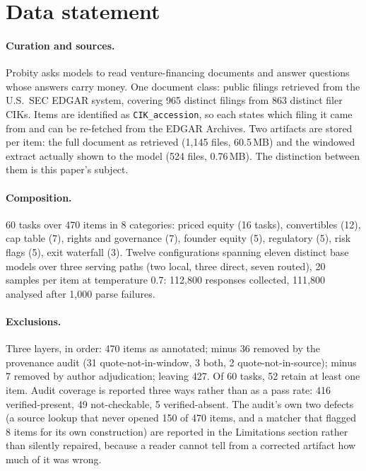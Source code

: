 \section{Data statement}
\label{sec:datastatement}

\paragraph{Curation and sources.} Probity asks models to read venture-financing documents and answer
questions whose answers carry money. One document class: public filings retrieved from the U.S.\ SEC
EDGAR system, covering 965 distinct filings from 863 distinct filer CIKs. Items are identified as
\texttt{CIK\_accession}, so each states which filing it came from and can be re-fetched from the
EDGAR Archives. Two artifacts are stored per item: the full document as retrieved
(1{,}145 files, 60.5\,MB) and the windowed extract actually shown to the model
(524 files, 0.76\,MB). The distinction between them is this paper's subject.

\paragraph{Composition.} 60 tasks over 470 items in 8 categories: priced equity (16 tasks),
convertibles (12), cap table (7), rights and governance (7), founder equity (5), regulatory (5),
risk flags (5), exit waterfall (3). Twelve configurations spanning eleven distinct base models over
three serving paths (two local, three direct, seven routed), 20 samples per item at temperature 0.7:
112{,}800 responses collected, 111{,}800 analysed after 1{,}000 parse failures.

\paragraph{Exclusions.} Three layers, in order: 470 items as annotated; minus 36 removed by the
provenance audit (31 quote-not-in-window, 3 both, 2 quote-not-in-source); minus 7 removed by author
adjudication; leaving 427. Of 60 tasks, 52 retain at least one item. Audit coverage is reported three
ways rather than as a pass rate: 416 verified-present, 49 not-checkable, 5 verified-absent. The
audit's own two defects (a source lookup that never opened 150 of 470 items, and a matcher that
flagged 8 items for its own construction) are reported in the Limitations section rather than
silently repaired, because a reader cannot tell from a corrected artifact how much of it was wrong.

